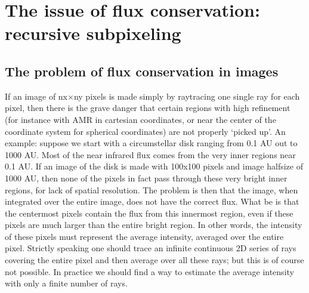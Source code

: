 \documentclass[letterpaper,10pt,english]{sphinxmanual}
\begin{document}
\section{The issue of flux conservation: recursive sub\sphinxhyphen{}pixeling}
\label{\detokenize{imagesspectra:the-issue-of-flux-conservation-recursive-sub-pixeling}}\label{\detokenize{imagesspectra:sec-image-refinement}}

\subsection{The problem of flux conservation in images}
\label{\detokenize{imagesspectra:the-problem-of-flux-conservation-in-images}}
If an image of nx\(\times\)ny pixels is made simply by ray\sphinxhyphen{}tracing one
single ray for each pixel, then there is the grave danger that certain regions
with high refinement (for instance with AMR in cartesian coordinates, or near
the center of the coordinate system for spherical coordinates) are not properly
‘picked up’. An example: suppose we start with a circumstellar disk ranging from
0.1 AU out to 1000 AU. Most of the near infrared flux comes from the very inner
regions near 0.1 AU. If an image of the disk is made with 100x100 pixels and
image half\sphinxhyphen{}size of 1000 AU, then none of the pixels in fact pass through these
very bright inner regions, for lack of spatial resolution.  The problem is then
that the image, when integrated over the entire image, does not have the correct
flux. What  be is that the centermost pixels contain the flux from this
innermost region, even if these pixels are much larger than the entire bright
region. In other words, the intensity of these pixels must represent the average
intensity, averaged over the entire pixel. Strictly speaking one should trace an
infinite continuous 2\sphinxhyphen{}D series of rays covering the entire pixel and then
average over all these rays; but this is of course not possible. In practice we
should find a way to estimate the average intensity with only a finite number of
rays.
\end{document}
